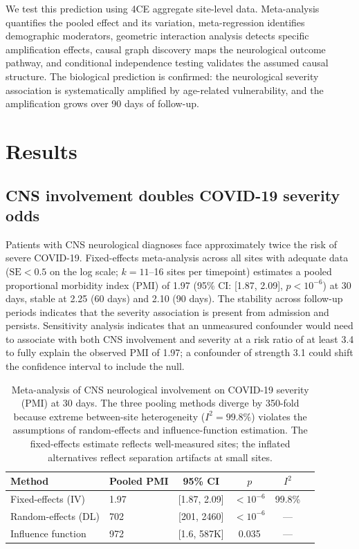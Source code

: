 \documentclass{article}
\begin{document}
We test this prediction using 4CE aggregate site-level data.
Meta-analysis quantifies the pooled effect and its variation, meta-regression identifies demographic moderators, geometric interaction analysis detects specific amplification effects, causal graph discovery maps the neurological outcome pathway, and conditional independence testing validates the assumed causal structure.
The biological prediction is confirmed: the neurological severity association is systematically amplified by age-related vulnerability, and the amplification grows over 90 days of follow-up.


\section{Results}

\subsection{CNS involvement doubles COVID-19 severity odds}

Patients with CNS neurological diagnoses face approximately twice the risk of severe COVID-19.
Fixed-effects meta-analysis across all sites with adequate data ($\text{SE} < 0.5$ on the log scale; $k = 11$--16 sites per timepoint) estimates a pooled proportional morbidity index (PMI) of 1.97 (95\% CI: [1.87, 2.09], $p < 10^{-6}$) at 30 days, stable at 2.25 (60 days) and 2.10 (90 days).
The stability across follow-up periods indicates that the severity association is present from admission and persists.
Sensitivity analysis \cite{vanderweele2017} indicates that an unmeasured confounder would need to associate with both CNS involvement and severity at a risk ratio of at least 3.4 to fully explain the observed PMI of 1.97; a confounder of strength 3.1 could shift the confidence interval to include the null.

\begin{table}[t]
\centering
\caption{Meta-analysis of CNS neurological involvement on COVID-19 severity (PMI) at 30 days. The three pooling methods diverge by 350-fold because extreme between-site heterogeneity ($I^2 = 99.8\%$) violates the assumptions of random-effects and influence-function estimation. The fixed-effects estimate reflects well-measured sites; the inflated alternatives reflect separation artifacts at small sites.}
\label{tab:meta}
\begin{tabular}{llcccc}
\toprule
Method & Pooled PMI & 95\% CI & $p$ & $I^2$ \\
\midrule
Fixed-effects (IV) & 1.97 & [1.87, 2.09] & $< 10^{-6}$ & 99.8\% \\
Random-effects (DL) & 702 & [201, 2460] & $< 10^{-6}$ & --- \\
Influence function & 972 & [1.6, 587K] & 0.035 & --- \\
\bottomrule
\end{tabular}
\end{table}
\end{document}
